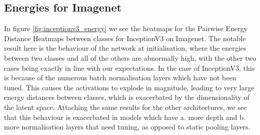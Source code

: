 \documentclass{article}
\begin{document}
        \subsection{Energies for Imagenet}
            In figure \ref{fig:inceptionv3_energy} we see the heatmaps for the Pairwise Energy Distance Heatmaps between classes for InceptionV3 on Imagenet. The notable result here is the behaviour of the network at initialisation, where the energies between two classes and all of the others are abnormally high, with the other two cases being exactly in line with our expectations. In the case of InceptionV3, this is because of the numerous batch normalisation layers which have not been tuned. This causes the activations to explode in magnitude, leading to very large energy distances between classes, which is exacerbated by the dimensionality of the latent space. Attaching the same results for the other architectures, we see that this behaviour is exacerbated in models which have a. more depth and b. more normalisation layers that need tuning, as opposed to static pooling layers. 
\end{document}
